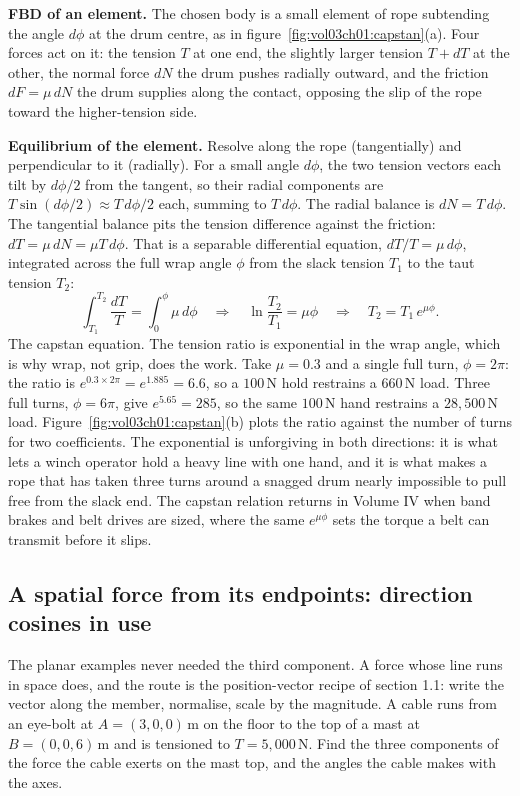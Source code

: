 \textbf{FBD of an element.} The chosen body is a small element of rope
subtending the angle $d\phi$ at the drum centre, as in
figure~\ref{fig:vol03ch01:capstan}(a). Four forces act on it: the tension
$T$ at one end, the slightly larger tension $T + dT$ at the other, the
normal force $dN$ the drum pushes radially outward, and the friction $dF =
\mu\,dN$ the drum supplies along the contact, opposing the slip of the rope
toward the higher-tension side.

\textbf{Equilibrium of the element.} Resolve along the rope (tangentially)
and perpendicular to it (radially). For a small angle $d\phi$, the two
tension vectors each tilt by $d\phi/2$ from the tangent, so their radial
components are $T\sin(d\phi/2) \approx T\,d\phi/2$ each, summing to $T\,
d\phi$. The radial balance is $dN = T\,d\phi$. The tangential balance pits
the tension difference against the friction: $dT = \mu\,dN = \mu T\,d\phi$.
That is a separable differential equation, $dT/T = \mu\,d\phi$, integrated
across the full wrap angle $\phi$ from the slack tension $T_1$ to the taut
tension $T_2$:
\[
\int_{T_1}^{T_2} \frac{dT}{T} = \int_0^{\phi} \mu\,d\phi
\quad\Longrightarrow\quad
\ln\frac{T_2}{T_1} = \mu\phi
\quad\Longrightarrow\quad
T_2 = T_1\,e^{\mu\phi}.
\]
The capstan equation. The tension ratio is exponential in the wrap angle,
which is why wrap, not grip, does the work. Take $\mu = 0.3$ and a single
full turn, $\phi = 2\pi$: the ratio is $e^{0.3 \times 2\pi} = e^{1.885} =
6.6$, so a $100\,\text{N}$ hold restrains a $660\,\text{N}$ load. Three full
turns, $\phi = 6\pi$, give $e^{5.65} = 285$, so the same $100\,\text{N}$
hand restrains a $28{,}500\,\text{N}$ load. Figure~\ref{fig:vol03ch01:capstan}(b) plots the ratio against the number of turns for two
coefficients. The exponential is unforgiving in both directions: it is what
lets a winch operator hold a heavy line with one hand, and it is what makes
a rope that has taken three turns around a snagged drum nearly impossible to
pull free from the slack end. The capstan relation returns in Volume IV when
band brakes and belt drives are sized, where the same $e^{\mu\phi}$ sets the
torque a belt can transmit before it slips.

\subsection{A spatial force from its endpoints: direction cosines in use}

The planar examples never needed the third component. A force whose line
runs in space does, and the route is the position-vector recipe of section
1.1: write the vector along the member, normalise, scale by the magnitude.
A cable runs from an eye-bolt at $A = (3, 0, 0)\,\si{\meter}$ on the floor
to the top of a mast at $B = (0, 0, 6)\,\si{\meter}$ and is tensioned to
$T = 5{,}000\,\text{N}$. Find the three components of the force the cable
exerts on the mast top, and the angles the cable makes with the axes.

